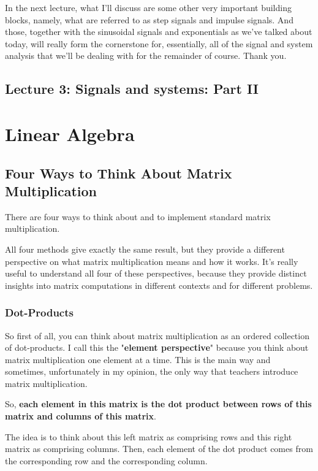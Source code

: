 \documentclass[fleqn,10pt]{olplainarticle}
\theoremstyle{definition}
\theoremstyle{remark}
\begin{document}
In the next lecture, what I'll discuss are some other very important building blocks, namely, what are referred to as step signals and impulse signals. And those, together with the sinusoidal signals and exponentials as we've talked about today, will really form the cornerstone for, essentially, all of the signal and system analysis that we'll be dealing with for the remainder of course. Thank you.

\pagebreak

\subsection*{Lecture 3: Signals and systems: Part II}

\pagebreak

\section*{Linear Algebra}

\subsection*{Four Ways to Think About Matrix Multiplication}

There are four ways to think about and to implement standard matrix multiplication.

All four methods give exactly the same result, but they provide a different perspective on what matrix multiplication means and how it works. It's really useful to understand all four of these perspectives, because they provide distinct insights into matrix computations in different contexts and for different problems.

\subsubsection*{Dot-Products}

So first of all, you can think about matrix multiplication as an ordered collection of dot-products. I call this the "\textbf{element perspective}" because you think about matrix multiplication one element at a time. This is the main way and sometimes, unfortunately in my opinion, the only way that teachers introduce matrix multiplication.

So, \textbf{each element in this matrix is the dot product between rows of this matrix and columns of this matrix}.

The idea is to think about this left matrix as comprising rows and this right matrix as comprising columns. Then, each element of the dot product comes from the corresponding row and the corresponding column.
\end{document}
